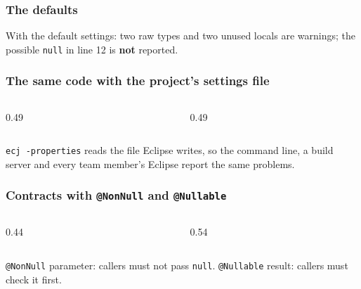 \documentclass[aspectratio=169,10pt,compress]{beamer}
\begin{document}
\begin{frame}[t,fragile] \frametitle{The defaults}

  \vspace{0.1em}
  \small
  With the default settings: two raw types and two unused locals are warnings; the possible \texttt{null} in line 12 is \textbf{not} reported.
\end{frame}




\begin{frame}[t,fragile] \frametitle{The same code with the project's settings file}
  \begin{columns}[T]
    \begin{column}{0.49\textwidth}
    \end{column}
    \begin{column}{0.49\textwidth}
    \end{column}
  \end{columns}

  \vspace{0.1em}
  \small
  \texttt{ecj -properties} reads the file Eclipse writes, so the command line, a build server and every team member's
  Eclipse report the same problems.
\end{frame}





\begin{frame}[t,fragile] \frametitle{Contracts with \texttt{@NonNull} and \texttt{@Nullable}}
  \begin{columns}[T]
    \begin{column}{0.44\textwidth}
    \end{column}
    \begin{column}{0.54\textwidth}
    \end{column}
  \end{columns}
  \small \texttt{@NonNull} parameter: callers must not pass \texttt{null}. \texttt{@Nullable} result: callers must check it first.
\end{frame}
\end{document}
